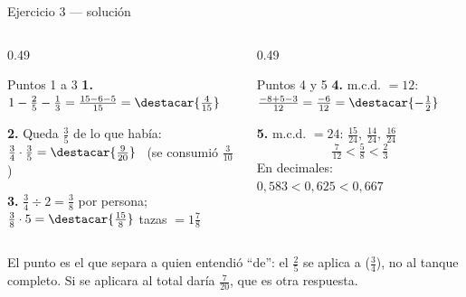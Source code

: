 \documentclass[aspectratio=169,10pt]{beamer}
\begin{document}
\begin{frame}{Ejercicio 3 — solución}
  \scriptsize
  \begin{columns}[T,onlytextwidth]
    \begin{column}{0.49\textwidth}
      \begin{block}{Puntos 1 a 3}
        \tiny
        \textbf{1.} $1-\tfrac{2}{5}-\tfrac{1}{3}
        = \tfrac{15-6-5}{15} = \destacar{\tfrac{4}{15}}$

        \vspace{0.08cm}
        \textbf{2.} Queda $\tfrac{3}{5}$ de lo que había:
        $\tfrac{3}{4}\cdot\tfrac{3}{5} = \destacar{\tfrac{9}{20}}$
        \ {\color{uniGris}(se consumió $\tfrac{3}{10}$)}

        \vspace{0.08cm}
        \textbf{3.} $\tfrac{3}{4}\div 2 = \tfrac{3}{8}$ por persona;
        $\tfrac{3}{8}\cdot 5 = \destacar{\tfrac{15}{8}}$ tazas
        $= 1\tfrac{7}{8}$
      \end{block}
    \end{column}
    \begin{column}{0.49\textwidth}
      \begin{block}{Puntos 4 y 5}
        \tiny
        \textbf{4.} m.c.d. $=12$:
        $\tfrac{-8+5-3}{12} = \tfrac{-6}{12}
        = \destacar{-\tfrac{1}{2}}$

        \vspace{0.1cm}
        \textbf{5.} m.c.d. $=24$:
        $\tfrac{15}{24},\ \tfrac{14}{24},\ \tfrac{16}{24}$
        \[ \tfrac{7}{12} < \tfrac{5}{8} < \tfrac{2}{3} \]
        {\color{uniGris}En decimales: $0{,}583 < 0{,}625 < 0{,}667$}
      \end{block}
    \end{column}
  \end{columns}

  \vspace{0.08cm}
  {\tiny\color{uniGris} El punto  es el que separa a quien entendió
  ``de'': el $\tfrac{2}{5}$ se aplica a  ($\tfrac{3}{4}$), no
  al tanque completo. Si se aplicara al total daría $\tfrac{7}{20}$, que es
  otra respuesta.}
\end{frame}
\end{document}

